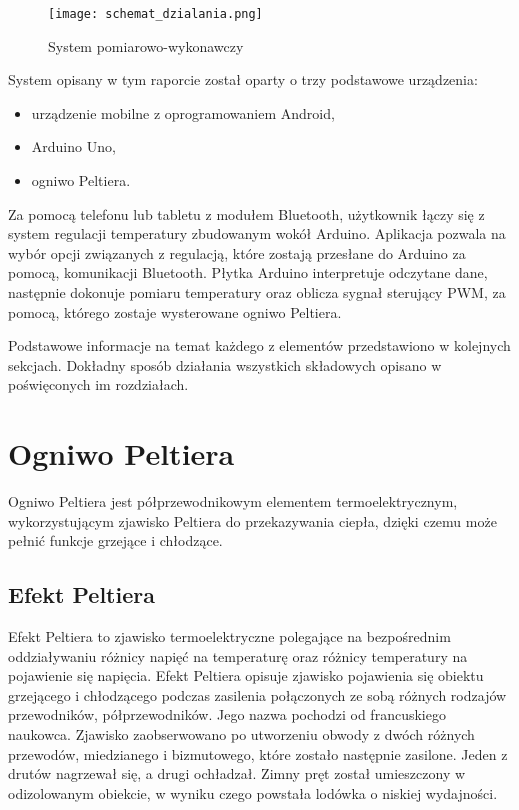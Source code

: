 \begin{figure}[H]
	\centering
	\texttt{[image: schemat\_dzialania.png]}
	\caption{System pomiarowo-wykonawczy}
\end{figure}
System opisany w tym raporcie został oparty o trzy podstawowe urządzenia:
\begin{itemize}
\item urządzenie mobilne z oprogramowaniem Android,
\item Arduino Uno,
\item ogniwo Peltiera.
\end{itemize}
Za pomocą telefonu lub tabletu z modułem Bluetooth, użytkownik łączy się z system regulacji temperatury zbudowanym wokół Arduino. Aplikacja pozwala na wybór opcji związanych z regulacją, które zostają przesłane do Arduino za pomocą, komunikacji Bluetooth. Płytka Arduino interpretuje odczytane dane, następnie dokonuje pomiaru temperatury oraz oblicza sygnał sterujący PWM, za pomocą, którego zostaje wysterowane ogniwo Peltiera.

Podstawowe informacje na temat każdego z elementów przedstawiono w kolejnych sekcjach. Dokładny sposób działania wszystkich składowych opisano w poświęconych im rozdziałach.



\section{Ogniwo Peltiera} %
Ogniwo Peltiera jest półprzewodnikowym elementem termoelektrycznym, wykorzystującym zjawisko Peltiera do przekazywania ciepła, dzięki czemu może pełnić funkcje grzejące i chłodzące.
\subsection{Efekt Peltiera} %
Efekt Peltiera to zjawisko termoelektryczne polegające na bezpośrednim oddziaływaniu różnicy napięć na temperaturę oraz różnicy temperatury na pojawienie się napięcia. Efekt Peltiera opisuje zjawisko pojawienia się 
obiektu grzejącego i chłodzącego podczas zasilenia połączonych ze sobą różnych rodzajów przewodników, półprzewodników. Jego nazwa pochodzi od francuskiego naukowca. Zjawisko zaobserwowano po utworzeniu obwody z dwóch różnych przewodów, miedzianego i bizmutowego, które zostało następnie zasilone. Jeden z drutów nagrzewał się, a drugi ochładzał. Zimny pręt został umieszczony w odizolowanym obiekcie, w wyniku czego powstała lodówka o niskiej wydajności.

